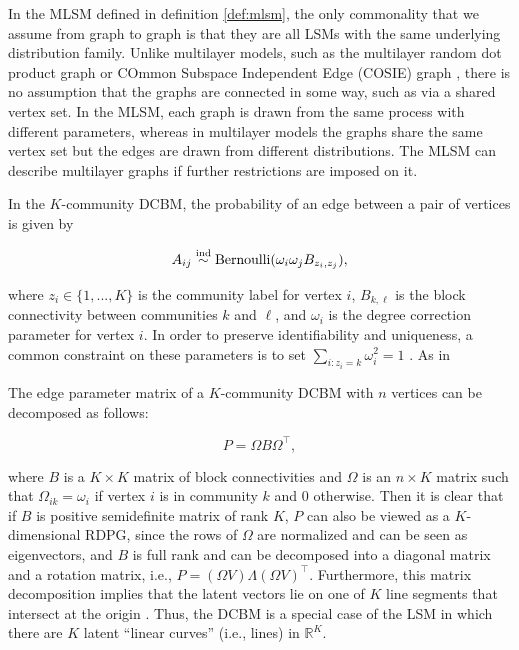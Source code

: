 \documentclass[12pt]{article}
\begin{document}
In the MLSM defined in definition \ref{def:mlsm}, the only commonality
that we assume from graph to graph is that they are all LSMs with the
same underlying distribution family. Unlike multilayer models, such as
the multilayer random dot product graph \citep{jones2021multilayer} or
COmmon Subspace Independent Edge (COSIE) graph
\citep{arroyo2020inference}, there is no assumption that the graphs are
connected in some way, such as via a shared vertex set. In the MLSM,
each graph is drawn from the same process with different parameters,
whereas in multilayer models the graphs share the same vertex set but
the edges are drawn from different distributions. The MLSM can describe
multilayer graphs if further restrictions are imposed on it.

\begin{example}
In the $K$-community DCBM, the probability of an edge between a pair of vertices is given by

$$A_{ij} \stackrel{\mathrm{ind}}{\sim} \mathrm{Bernoulli}(\omega_i \omega_j B_{z_i, z_j}),$$

where $z_i \in \{1, ..., K\}$ is the community label for vertex $i$, $B_{k, \ell}$ is the block connectivity between communities $k$ and $\ell$, and $\omega_i$ is the degree correction parameter for vertex $i$. 
In order to preserve identifiability and uniqueness, a common constraint on these parameters is to set $\sum_{i : z_i = k} \omega_i^2 = 1$ \citep{Karrer_2011}. 
As in 

The edge parameter matrix of a $K$-community DCBM with $n$ vertices can be decomposed as follows:

$$P = \Omega B \Omega^\top,$$

where $B$ is a $K \times K$ matrix of block connectivities and $\Omega$ is an $n \times K$ matrix such that $\Omega_{ik} = \omega_i$ if vertex $i$ is in community $k$ and $0$ otherwise. 
Then it is clear that if $B$ is positive semidefinite matrix of rank $K$, $P$ can also be viewed as a $K$-dimensional RDPG, since the rows of $\Omega$ are normalized and can be seen as eigenvectors, and $B$ is full rank and can be decomposed into a diagonal matrix and a rotation matrix, i.e., $P = (\Omega V) \Lambda (\Omega V)^\top$. 
Furthermore, this matrix decomposition implies that the latent vectors lie on one of $K$ line segments that intersect at the origin \citep{rubindelanchy2017statistical}. 
Thus, the DCBM is a special case of the LSM in which there are $K$ latent ``linear curves'' (i.e., lines) in $\mathbb{R}^K$. 


\end{example}
\end{document}
